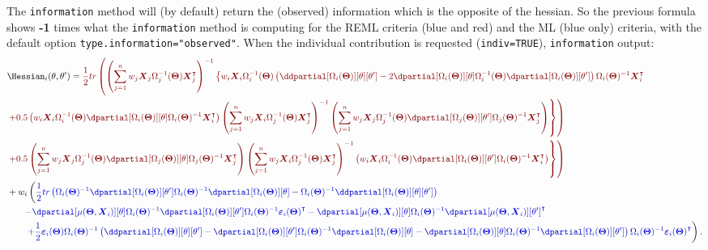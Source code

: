 \documentclass[12pt]{article}
\newcommand{\darkblue}{blue!80!black}
\newcommand{\darkred}{red!50!black}
\newcommand\trans[1]{{#1}^\intercal}%
\newcommand{\param}{\Theta}
\newcommand{\Vparam}{\boldsymbol{\param}}
\newcommand{\VX}{\boldsymbol{X}}
\newcommand{\Vvarepsilon}{\boldsymbol{\varepsilon}}
\begin{document}
\bigskip

The \texttt{information} method will (by default) return the (observed)
 information which is the opposite of the hessian. So the previous
 formula shows \textbf{-1} times what the \texttt{information} method is computing
 for the REML criteria (blue and red) and the ML (blue only) criteria,
 with the default option
 \texttt{type.information="observed"}. When the individual
 contribution is requested (\texttt{indiv=TRUE}), \texttt{information} output:
\begin{align*}
& \Hessian_i(\theta,\theta^{\prime}) = \textcolor{\darkred}{\frac{1}{2} tr \left( \left(\sum_{j=1}^n w_j \VX_j \Omega_j^{-1}(\Vparam) \trans{\VX}_j\right)^{-1} \left\{w_i \VX_i \Omega_i^{-1}(\Vparam) \left(\ddpartial[\Omega_i(\Vparam)][\theta][\theta^{\prime}] - 2 \dpartial[\Omega_i(\Vparam)][\theta] \Omega_i^{-1}(\Vparam) \dpartial[\Omega_i(\Vparam)][\theta^{\prime}]\right)\Omega_i(\Vparam)^{-1} \trans{\VX}_i \right.  \right.}  \\
& \textcolor{\darkred}{ \left. \left. + 0.5\left(w_i \VX_i \Omega_i^{-1}(\Vparam) \dpartial[\Omega_i(\Vparam)][\theta] \Omega_i(\Vparam)^{-1} \trans{\VX}_i\right) \left(\sum_{j=1}^n w_j \VX_i\Omega_j^{-1}(\Vparam) \trans{\VX}_j \right)^{-1} \left(\sum_{j=1}^n w_j \VX_j \Omega_j^{-1}(\Vparam) \dpartial[\Omega_j(\Vparam)][\theta^{\prime}] \Omega_j(\Vparam)^{-1} \trans{\VX}_j\right) \right\} \right) } \\
& \textcolor{\darkred}{ \left. \left. + 0.5\left(\sum_{j=1}^n w_j \VX_j \Omega_j^{-1}(\Vparam) \dpartial[\Omega_j(\Vparam)][\theta] \Omega_j(\Vparam)^{-1} \trans{\VX}_j\right) \left(\sum_{j=1}^n w_j \VX_i\Omega_j^{-1}(\Vparam) \trans{\VX}_j \right)^{-1} \left(w_i \VX_i \Omega_i^{-1}(\Vparam) \dpartial[\Omega_i(\Vparam)][\theta^{\prime}] \Omega_i(\Vparam)^{-1} \trans{\VX}_i\right) \right\} \right) } \\
& + w_i \left( \textcolor{\darkblue}{ \frac{1}{2} tr\left(\Omega_i(\Vparam)^{-1} \dpartial[\Omega_i(\Vparam)][\theta^{\prime}] \Omega_i(\Vparam)^{-1} \dpartial[\Omega_i(\Vparam)][\theta] - \Omega_i(\Vparam)^{-1} \ddpartial[\Omega_i(\Vparam)][\theta][\theta^{\prime}] \right) } \right.\\
& \qquad \textcolor{\darkblue}{ -  \dpartial[\mu(\Vparam,\VX_i)][\theta] \Omega_i(\Vparam)^{-1} \dpartial[\Omega_i(\Vparam)][\theta^{\prime}] \Omega_i(\Vparam)^{-1} \trans{\Vvarepsilon_i(\Vparam)} - \dpartial[\mu(\Vparam,\VX_i)][\theta] \Omega_i(\Vparam)^{-1} \trans{\dpartial[\mu(\Vparam,\VX_i)][\theta^{\prime}]} } \\
& \qquad \left. \textcolor{\darkblue}{ + \frac{1}{2} \Vvarepsilon_i(\Vparam) \Omega_i(\Vparam)^{-1} \left(\ddpartial[\Omega_i(\Vparam)][\theta][\theta^{\prime}] - \dpartial[\Omega_i(\Vparam)][\theta^{\prime}] \Omega_i(\Vparam)^{-1} \dpartial[\Omega_i(\Vparam)][\theta] - \dpartial[\Omega_i(\Vparam)][\theta] \Omega_i(\Vparam)^{-1} \dpartial[\Omega_i(\Vparam)][\theta^{\prime}] \right) \Omega_i(\Vparam)^{-1} \trans{\Vvarepsilon_i(\Vparam)} } \right).
\end{align*}
\end{document}
